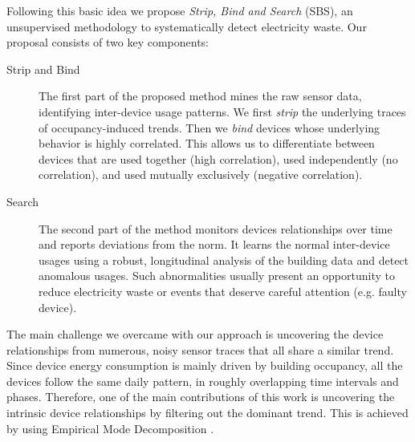 Following this basic idea we propose \emph{Strip, Bind and Search} (SBS), an unsupervised methodology to systematically detect electricity waste.
Our proposal consists of two key components:

\begin{description}
 \item[Strip and Bind] The first part of the proposed method mines the raw sensor data, identifying inter-device usage patterns. %
We first \emph{strip} the underlying traces of occupancy-induced trends.  Then we \emph{bind} devices  whose underlying behavior is highly correlated. %
 This allows us to differentiate between devices that are used together (high correlation), used independently (no correlation), and used mutually exclusively (negative correlation).
 \item[Search] The second part of the method monitors devices relationships over time and reports deviations from the norm.  %
 It learns the normal inter-device usages using a robust, longitudinal analysis of the building data and detect anomalous usages.  Such abnormalities usually present an opportunity to reduce electricity waste or events that deserve careful attention (e.g. faulty device).
\end{description}

The main challenge we overcame with our approach is uncovering the device relationships from numerous, noisy sensor traces
that all share a similar trend.
Since device energy consumption is mainly driven by building occupancy, all the devices follow the same daily pattern, 
in roughly overlapping time intervals and phases.
Therefore, one of the main contributions of this work is uncovering the intrinsic device relationships by filtering out the dominant
trend.  This is achieved by using Empirical Mode Decomposition \cite{huang:emd1998}.

